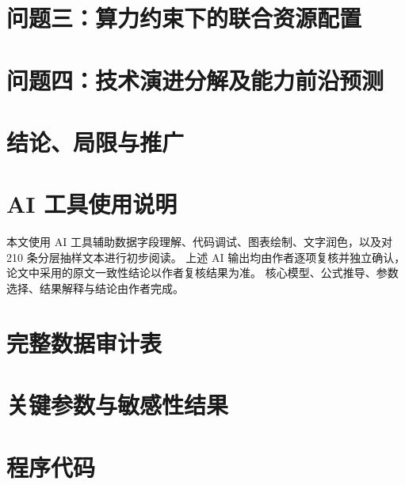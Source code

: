 \documentclass[bwprint]{gmcmthesis}
\begin{document}
\section{问题三：算力约束下的联合资源配置}

\section{问题四：技术演进分解及能力前沿预测}

\section{结论、局限与推广}

\clearpage




\clearpage

\section*{AI 工具使用说明}
本文使用 AI 工具辅助数据字段理解、代码调试、图表绘制、文字润色，以及对 210 条分层抽样文本进行初步阅读。
上述 AI 输出均由作者逐项复核并独立确认，论文中采用的原文一致性结论以作者复核结果为准。
核心模型、公式推导、参数选择、结果解释与结论由作者完成。

\clearpage

\begin{appendices}
    \section{完整数据审计表}

    \section{关键参数与敏感性结果}

    \section{程序代码}
\end{appendices}
\end{document}
